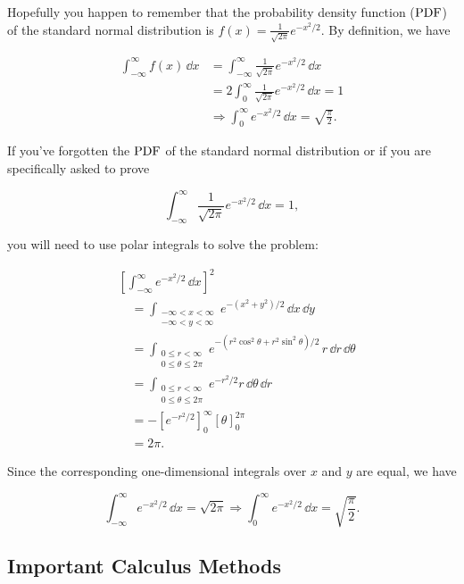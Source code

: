 \begin{solution}
Hopefully you happen to remember that the probability density function (\(\mathrm{PDF}\)) of the standard
normal distribution is $f(x)=\frac{1}{\sqrt{2\pi}}e^{-x^2/2}$. By definition, we have

\[
  \begin{aligned}
  \int_{-\infty}^{\infty}f(x)\,\dd x
  &=\int_{-\infty}^{\infty}\frac{1}{\sqrt{2\pi}}e^{-x^2/2}\,\dd x\\
  &=2\int_{0}^{\infty}\frac{1}{\sqrt{2\pi}}e^{-x^2/2}\,\dd x=1\\
  &\Rightarrow \int_{0}^{\infty}e^{-x^2/2}\,\dd x=\sqrt{\frac{\pi}{2}}.
  \end{aligned}
\]

If you've forgotten the \(\mathrm{PDF}\) of the standard normal distribution or if you are specifically asked
to prove

\[
  \int_{-\infty}^{\infty}\frac{1}{\sqrt{2\pi}}e^{-x^2/2}\,\dd x=1,
\]

you will need to use polar integrals to solve the problem:

\[
\begin{aligned}
  &\left[\int_{-\infty}^{\infty}e^{-x^2/2}\,\dd x\right]^2 \\
  &\quad=\int_{\substack{-\infty<x<\infty\\-\infty<y<\infty}}
   e^{-(x^2+y^2)/2}\,\dd x\,\dd y \\
  &\quad=\int_{\substack{0\leq r<\infty\\0\leq\theta\leq2\pi}}
   e^{-(r^2\cos^2\theta+r^2\sin^2\theta)/2}\,r\,\dd r\,\dd\theta \\
  &\quad=\int_{\substack{0\leq r<\infty\\0\leq\theta\leq2\pi}}e^{-r^2/2}r\,\dd\theta\,\dd r \\
  &\quad=-\left[e^{-r^2/2}\right]_{0}^{\infty}\left[\theta\right]_{0}^{2\pi}\\
  &\quad=2\pi.
\end{aligned}
\]

Since the corresponding one-dimensional integrals over $x$ and $y$ are equal, we have

\[
  \int_{-\infty}^{\infty}e^{-x^2/2}\,\dd x=\sqrt{2\pi}
  \Rightarrow \int_{0}^{\infty}e^{-x^2/2}\,\dd x=\sqrt{\frac{\pi}{2}}.
\]
\end{solution}

\subsection{Important Calculus Methods}

